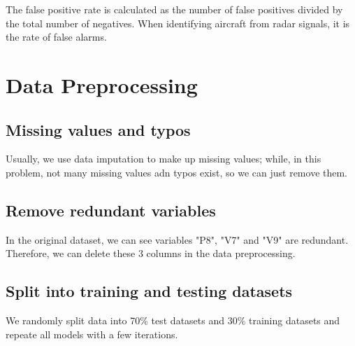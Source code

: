 \documentclass[11pt]{article}
\begin{document}
The false positive rate is calculated as the number of false positives divided by the total number of negatives. When identifying aircraft from radar signals, it is the rate of false alarms.


\section{Data Preprocessing}
\subsection{Missing values and typos}
Usually, we use data imputation to make up missing values; while, in this problem, not many missing values adn typos exist, so we can just remove them. 

\subsection{Remove redundant variables}
In the original dataset, we can see variables "P8", "V7" and "V9" are redundant. Therefore, we can delete these 3 columns in the data preprocessing.

\subsection{Split into training and testing datasets}
We randomly split data into 70\% test datasets and 30\% training datasets and repeate all models with a few iterations.
\end{document}
